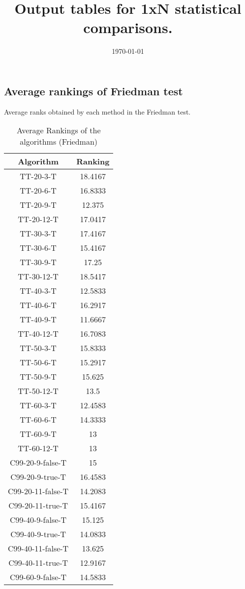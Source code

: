 \documentclass[a4paper,10pt]{article}
\title{Output tables for 1xN statistical comparisons.}
\author{}
\date{\today}
\begin{document}
\begin{landscape}
\pagestyle{empty}
\maketitle
\thispagestyle{empty}

\section{Average rankings of Friedman test}


Average ranks obtained by each method in the Friedman test.

\begin{table}[!htp]
\centering
\begin{tabular}{|c|c|}\hline
Algorithm&Ranking\\\hline
TT-20-3-T&18.4167\\TT-20-6-T&16.8333\\TT-20-9-T&12.375\\TT-20-12-T&17.0417\\TT-30-3-T&17.4167\\TT-30-6-T&15.4167\\TT-30-9-T&17.25\\TT-30-12-T&18.5417\\TT-40-3-T&12.5833\\TT-40-6-T&16.2917\\TT-40-9-T&11.6667\\TT-40-12-T&16.7083\\TT-50-3-T&15.8333\\TT-50-6-T&15.2917\\TT-50-9-T&15.625\\TT-50-12-T&13.5\\TT-60-3-T&12.4583\\TT-60-6-T&14.3333\\TT-60-9-T&13\\TT-60-12-T&13\\C99-20-9-false-T&15\\C99-20-9-true-T&16.4583\\C99-20-11-false-T&14.2083\\C99-20-11-true-T&15.4167\\C99-40-9-false-T&15.125\\C99-40-9-true-T&14.0833\\C99-40-11-false-T&13.625\\C99-40-11-true-T&12.9167\\C99-60-9-false-T&14.5833\\\hline\end{tabular}
\caption{Average Rankings of the algorithms (Friedman)}
\end{table}


\end{landscape}
\end{document}
